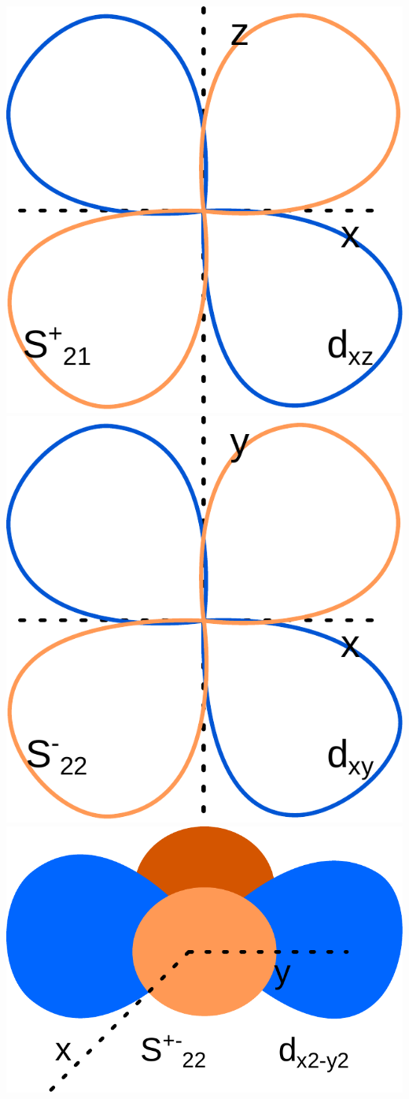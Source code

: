 \documentclass[french]{yLectureNote}
\begin{document}
\includegraphics[scale=0.3]{s+21}
\includegraphics[scale=0.3]{s-22}
\includegraphics[scale=0.3]{s+22}
\end{document}
